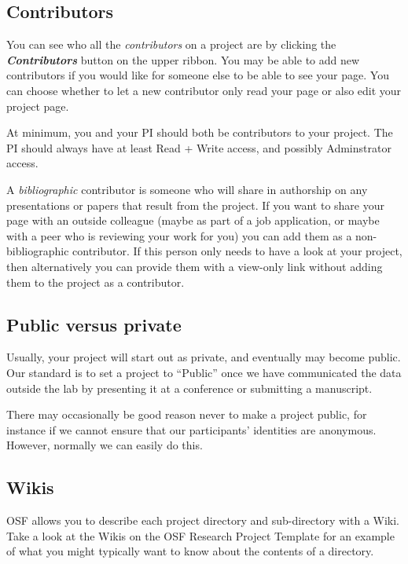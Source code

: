 \documentclass[12pt,]{book}
\theoremstyle{definition}
\theoremstyle{definition}
\theoremstyle{definition}
\theoremstyle{remark}
\begin{document}
\subsection{Contributors}\label{contributors}

You can see who all the \emph{contributors} on a project are by clicking
the \textbf{\emph{Contributors}} button on the upper ribbon. You may be
able to add new contributors if you would like for someone else to be
able to see your page. You can choose whether to let a new contributor
only read your page or also edit your project page.

At minimum, you and your PI should both be contributors to your project.
The PI should always have at least Read + Write access, and possibly
Adminstrator access.

A \emph{bibliographic} contributor is someone who will share in
authorship on any presentations or papers that result from the project.
If you want to share your page with an outside colleague (maybe as part
of a job application, or maybe with a peer who is reviewing your work
for you) you can add them as a non-bibliographic contributor. If this
person only needs to have a look at your project, then alternatively you
can provide them with a view-only link without adding them to the
project as a contributor.

\subsection{Public versus private}\label{public-versus-private}

Usually, your project will start out as private, and eventually may
become public. Our standard is to set a project to ``Public'' once we
have communicated the data outside the lab by presenting it at a
conference or submitting a manuscript.

There may occasionally be good reason never to make a project public,
for instance if we cannot ensure that our participants' identities are
anonymous. However, normally we can easily do this.

\subsection{Wikis}\label{wikis}

OSF allows you to describe each project directory and sub-directory with
a Wiki. Take a look at the Wikis on the OSF Research Project Template
for an example of what you might typically want to know about the
contents of a directory.
\end{document}
